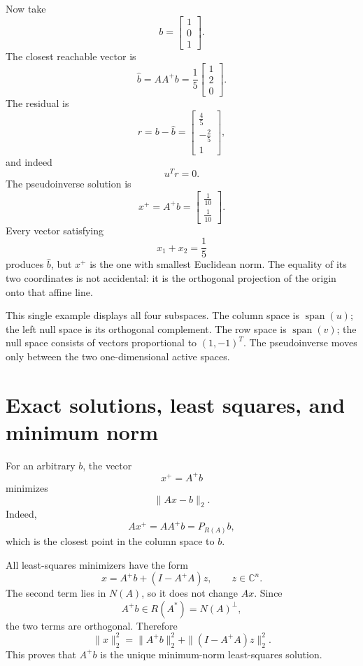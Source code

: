 Now take
\[
  b=
  \begin{bmatrix}1\\0\\1\end{bmatrix}.
\]
The closest reachable vector is
\[
  \widehat b=AA^+b
  =\frac15
  \begin{bmatrix}1\\2\\0\end{bmatrix}.
\]
The residual is
\[
  r=b-\widehat b
  =
  \begin{bmatrix}
    \frac45\\[2pt]
    -\frac25\\[2pt]
    1
  \end{bmatrix},
\]
and indeed
\[
  u^Tr=0.
\]
The pseudoinverse solution is
\[
  x^+=A^+b
  =
  \begin{bmatrix}
    \frac1{10}\\[2pt]
    \frac1{10}
  \end{bmatrix}.
\]
Every vector satisfying
\[
  x_1+x_2=\frac15
\]
produces \(\widehat b\), but \(x^+\) is the one with smallest Euclidean norm.  The equality of its two coordinates is not accidental: it is the orthogonal projection of the origin onto that affine line.

This single example displays all four subspaces.  The column space is \(\operatorname{span}(u)\); the left null space is its orthogonal complement.  The row space is \(\operatorname{span}(v)\); the null space consists of vectors proportional to \((1,-1)^T\).  The pseudoinverse moves only between the two one-dimensional active spaces.

\section{Exact solutions, least squares, and minimum norm}

For an arbitrary \(b\), the vector
\[
  x^+=A^+b
\]
minimizes
\[
  \|Ax-b\|_2.
\]
Indeed,
\[
  Ax^+=AA^+b=P_{R(A)}b,
\]
which is the closest point in the column space to \(b\).

All least-squares minimizers have the form
\[
  x=A^+b+(I-A^+A)z,
  \qquad z\in\mathbb C^n.
\]
The second term lies in \(N(A)\), so it does not change \(Ax\).  Since
\[
  A^+b\in R(A^*)=N(A)^\perp,
\]
the two terms are orthogonal.  Therefore
\[
  \|x\|_2^2
  =\|A^+b\|_2^2
   +\|(I-A^+A)z\|_2^2.
\]
This proves that \(A^+b\) is the unique minimum-norm least-squares solution.

